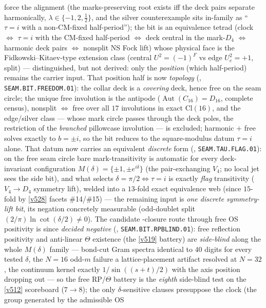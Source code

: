 \documentclass[11pt,a4paper]{article}
\begin{document}
\begin{keybox}
force the alignment (the marks-preserving root exists iff the deck pairs separate harmonically,
$\lambda\in\{-1,2,\tfrac12\}$, and the silver counterexample sits in-family as ``$\tau=i$ with a
non-CM-fixed half-period''); the bit is an equivalence tetrad (clock $\iff$ $\tau{=}i$ with the
CM-fixed half-period $\iff$ deck central in the mark-$D_4$ $\iff$ harmonic deck pairs $\iff$
nonsplit NS Fock lift) whose physical face is the Fidkowski--Kitaev-type extension class (central
$U^2=(-1)^F$ vs edge $U_e^2=+1$, split) --- distinguished, but not derived: only the
\emph{position} (which half-period) remains the carrier input. That position half is now
\emph{topology} (, \texttt{SEAM.BIT.FREEDOM.01}): the collar deck
is a \emph{covering} deck, hence free on the seam circle; the unique free involution is the antipode
($\operatorname{Aut}(C_{16})=D_{16}$, complete census), nonsplit $\iff$ free over all $17$
involutions in exact $\mathrm{Cl}(16)$, and the edge/silver class --- whose mark circle passes
through the deck poles, the restriction of the \emph{branched} pillowcase involution --- is
excluded; harmonic $+$ free solves exactly to $b=\pm i$, so the bit reduces to the square-modulus
datum $\tau=i$ alone. That datum now carries an equivalent \emph{discrete} form
(, \texttt{SEAM.TAU.FLAG.01}): on the free seam circle bare
mark-transitivity is automatic for every deck-invariant configuration $M(\delta)=\{\pm1,\pm
e^{i\delta}\}$ (the pair-exchanging $V_4$; no local jet sees the side bit), and what selects
$\delta=\pi/2\iff\tau=i$ is exactly \emph{flag} transitivity ($V_4\to D_4$ symmetry lift), welded
into a $13$-fold exact equivalence web (since $15$-fold by \vref{v528} facets \#14/\#15) --- the remaining input is \emph{one discrete symmetry-lift
bit}, its negation concretely measurable (odd-doublet split $(2/\pi)\ln\cot(\delta/2)\neq0$).
The candidate \mE-closure route through free OS positivity is since \emph{decided negative}
(, \texttt{SEAM.BIT.RPBLIND.01}): free reflection positivity
and anti-linear $\Theta$ existence (the \vref{v519} battery) are \emph{side-blind} along the whole
$M(\delta)$ family --- bond-cut Gram spectra identical to $40$ digits for every tested $\delta$,
the $N=16$ odd-$m$ failure a lattice-placement artifact resolved at $N=32$, the continuum kernel
exactly $1/\sin((s{+}t)/2)$ with the axis position dropping out --- so the free RP/$\Theta$ battery
is the \emph{eighth} side-blind test on the \vref{v512} scoreboard ($7\to8$); the only
$\delta$-sensitive clauses presuppose the clock (the group generated by the admissible OS

\end{keybox}
\end{document}

